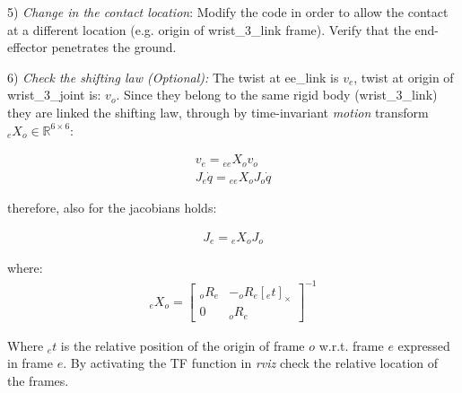 \documentclass{report}
\newcommand{\Rnum}{\mathbb{R}} %
\newcommand{\mat}[1]{\ensuremath{\begin{bmatrix}#1\end{bmatrix}}}	%
\begin{document}
5)  \textit{Change in the contact location}:
Modify the code in order to allow the contact at a different location (e.g. origin of wrist\_3\_link frame).  Verify that the end-effector penetrates the ground. 

6) \textit{Check the shifting law (Optional):}
The twist at ee\_link is $v_{e}$, twist at origin of wrist\_3\_joint is: $v_o$. Since they belong to the same rigid body (wrist\_3\_link) they are linked the shifting law, through by time-invariant \textit{motion} transform ${}_{e}X_o \in \Rnum^{6 \times 6}$:

\begin{align}
  v_{e} = {}_{ee}X_o v_o\\
  J_{e} \dot{q} = {}_{ee}X_o J_o \dot{q}
	\label{fig:}
\end{align}

therefore, also for the jacobians holds:

\begin{align}
J_{e}  = {}_{e}X_o J_o
\label{fig:}
\end{align}

where: 
\begin{align}
{}_{e}X_o  = \mat{ {}_{o}R_e   &  -{}_o R_e [{}_{e}t]_{\times} \\
					0             &     {}_oR_{e}} ^{-1}
\label{fig:}
\end{align}

Where ${}_{e}t$ is the relative position of the origin of frame ${o}$ w.r.t. frame $e$ expressed 
in frame ${e}$.
By activating the TF function in \textit{rviz} check the relative location of the frames. 

 
\end{document}
